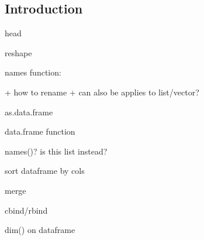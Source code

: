 
\subsection{Introduction}

head

reshape

names function:

+ how to rename
+ can also be applies to list/vector?

as.data.frame

data.frame function

names()? is this list instead?

sort dataframe by cols

merge

cbind/rbind

dim() on dataframe

